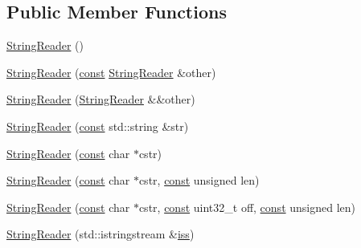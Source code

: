\subsection*{Public Member Functions}
\begin{DoxyCompactItemize}
\item 
\mbox{\hyperlink{classlucene_1_1core_1_1analysis_1_1StringReader_a58300c89dc23bee57f60fea22572d3da}{String\+Reader}} ()
\item 
\mbox{\hyperlink{classlucene_1_1core_1_1analysis_1_1StringReader_ac531f5f4b388f8a7cfd2ea0c2ef1a55c}{String\+Reader}} (\mbox{\hyperlink{ZlibCrc32_8h_a2c212835823e3c54a8ab6d95c652660e}{const}} \mbox{\hyperlink{classlucene_1_1core_1_1analysis_1_1StringReader}{String\+Reader}} \&other)
\item 
\mbox{\hyperlink{classlucene_1_1core_1_1analysis_1_1StringReader_accebdb26d787469d4f32f94c8c29257b}{String\+Reader}} (\mbox{\hyperlink{classlucene_1_1core_1_1analysis_1_1StringReader}{String\+Reader}} \&\&other)
\item 
\mbox{\hyperlink{classlucene_1_1core_1_1analysis_1_1StringReader_a72cb772b6be24d3f3c7055932a30a41d}{String\+Reader}} (\mbox{\hyperlink{ZlibCrc32_8h_a2c212835823e3c54a8ab6d95c652660e}{const}} std\+::string \&str)
\item 
\mbox{\hyperlink{classlucene_1_1core_1_1analysis_1_1StringReader_a2c3a2da6f1c5b1affbdee25ffcb235a6}{String\+Reader}} (\mbox{\hyperlink{ZlibCrc32_8h_a2c212835823e3c54a8ab6d95c652660e}{const}} char $\ast$cstr)
\item 
\mbox{\hyperlink{classlucene_1_1core_1_1analysis_1_1StringReader_a4c9a31c3c535283012a540e19077d1e5}{String\+Reader}} (\mbox{\hyperlink{ZlibCrc32_8h_a2c212835823e3c54a8ab6d95c652660e}{const}} char $\ast$cstr, \mbox{\hyperlink{ZlibCrc32_8h_a2c212835823e3c54a8ab6d95c652660e}{const}} unsigned len)
\item 
\mbox{\hyperlink{classlucene_1_1core_1_1analysis_1_1StringReader_a836d26003eca1d1def03daecf3487bfd}{String\+Reader}} (\mbox{\hyperlink{ZlibCrc32_8h_a2c212835823e3c54a8ab6d95c652660e}{const}} char $\ast$cstr, \mbox{\hyperlink{ZlibCrc32_8h_a2c212835823e3c54a8ab6d95c652660e}{const}} uint32\+\_\+t off, \mbox{\hyperlink{ZlibCrc32_8h_a2c212835823e3c54a8ab6d95c652660e}{const}} unsigned len)
\item 
\mbox{\hyperlink{classlucene_1_1core_1_1analysis_1_1StringReader_af30fe6285128fd4b1d2553017be84501}{String\+Reader}} (std\+::istringstream \&\mbox{\hyperlink{classlucene_1_1core_1_1analysis_1_1StringReader_ada023622e5d849d9fe8e9fcb838af328}{iss}})

\end{DoxyCompactItemize}
